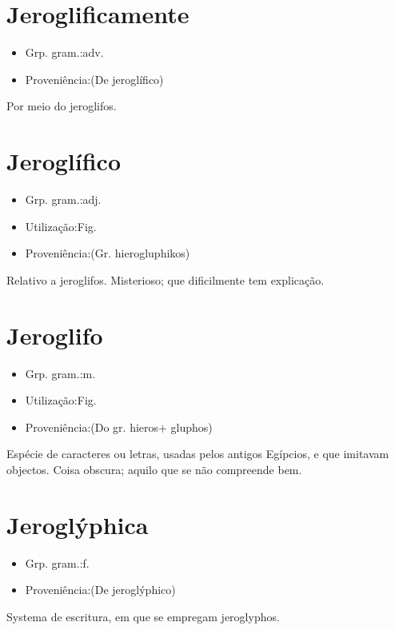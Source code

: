 \documentclass{article}
\begin{document}
\section{Jeroglificamente}
\begin{itemize}
\item {Grp. gram.:adv.}
\end{itemize}
\begin{itemize}
\item {Proveniência:(De \textunderscore jeroglífico\textunderscore )}
\end{itemize}
Por meio do jeroglifos.
\section{Jeroglífico}
\begin{itemize}
\item {Grp. gram.:adj.}
\end{itemize}
\begin{itemize}
\item {Utilização:Fig.}
\end{itemize}
\begin{itemize}
\item {Proveniência:(Gr. \textunderscore hierogluphikos\textunderscore )}
\end{itemize}
Relativo a jeroglifos.
Misterioso; que dificilmente tem explicação.
\section{Jeroglifo}
\begin{itemize}
\item {Grp. gram.:m.}
\end{itemize}
\begin{itemize}
\item {Utilização:Fig.}
\end{itemize}
\begin{itemize}
\item {Proveniência:(Do gr. \textunderscore hieros\textunderscore  + \textunderscore gluphos\textunderscore )}
\end{itemize}
Espécie de caracteres ou letras, usadas pelos antigos Egípcios, e que imitavam objectos.
Coisa obscura; aquilo que se não compreende bem.
\section{Jeroglýphica}
\begin{itemize}
\item {Grp. gram.:f.}
\end{itemize}
\begin{itemize}
\item {Proveniência:(De \textunderscore jeroglýphico\textunderscore )}
\end{itemize}
Systema de escritura, em que se empregam jeroglyphos.
\end{document}
